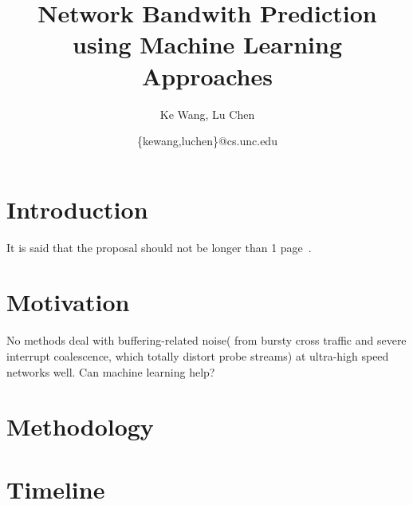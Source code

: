 \documentclass[11pt]{article}
\title{Network Bandwith Prediction using Machine Learning Approaches}
\author{Ke Wang, Lu Chen} %
\date{\{kewang,luchen\}@cs.unc.edu}
\begin{document}
\maketitle

\section{Introduction}
\label{sec:introduction}
It is said that the proposal should not be longer than 1 page~\cite{yin2014}.
\section{Motivation}
\label{sec:motivation}
No methods deal with buffering-related noise( from bursty cross traffic and
severe interrupt coalescence, which totally distort probe streams) at
ultra-high speed networks well. Can machine learning help?
\section{Methodology}
\label{sec:methodology}

\section{Timeline}
\label{sec:timeline}



\end{document}
